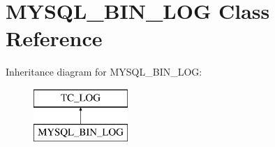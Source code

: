 \hypertarget{classMYSQL__BIN__LOG}{}\section{M\+Y\+S\+Q\+L\+\_\+\+B\+I\+N\+\_\+\+L\+OG Class Reference}
\label{classMYSQL__BIN__LOG}
Inheritance diagram for M\+Y\+S\+Q\+L\+\_\+\+B\+I\+N\+\_\+\+L\+OG\+:\begin{figure}[H]
\begin{center}
\leavevmode
\includegraphics[height=2.000000cm]{classMYSQL__BIN__LOG}
\end{center}
\end{figure}
